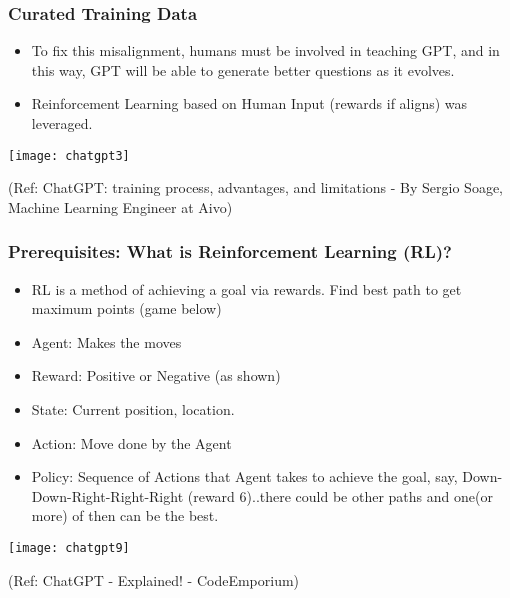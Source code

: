 \begin{frame}[fragile]\frametitle{Curated Training Data}


\begin{itemize}
\item To fix this misalignment, humans must be involved in teaching GPT, and in this way, GPT will be able to generate better questions as it evolves.
\item Reinforcement Learning based on Human Input (rewards if aligns) was leveraged.
\end{itemize}	 

\begin{center}
\texttt{[image: chatgpt3]}

\end{center}		

{\tiny (Ref: ChatGPT: training process, advantages, and limitations - By Sergio Soage, Machine Learning Engineer at Aivo)}
			
\end{frame}


\begin{frame}[fragile]\frametitle{Prerequisites: What is Reinforcement Learning (RL)?}


\begin{itemize}
\item RL is a method of achieving a goal via rewards. Find best path to get maximum points (game below)
\item Agent: Makes the moves
\item Reward: Positive or Negative (as shown)
\item State: Current position, location.
\item Action: Move done by the Agent
\item Policy: Sequence of Actions that Agent takes to achieve the goal, say, Down-Down-Right-Right-Right (reward 6)..there could be other paths and one(or more) of then can be the best.
\end{itemize}	 


\begin{center}
\texttt{[image: chatgpt9]}
\end{center}		


{\tiny (Ref: ChatGPT - Explained! - CodeEmporium)}
\end{frame}

